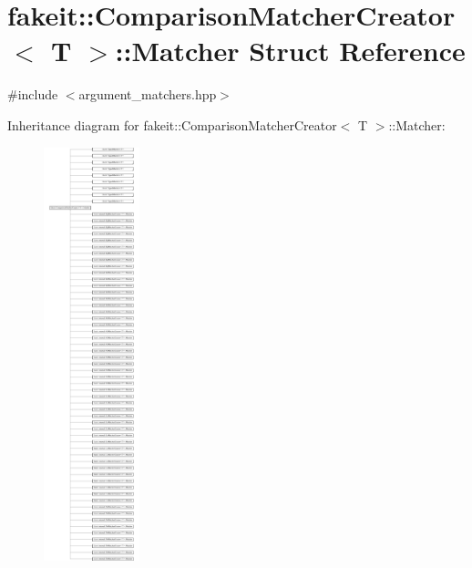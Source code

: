 \hypertarget{structfakeit_1_1ComparisonMatcherCreator_1_1Matcher}{}\section{fakeit\+::Comparison\+Matcher\+Creator$<$ T $>$\+::Matcher Struct Reference}
\label{structfakeit_1_1ComparisonMatcherCreator_1_1Matcher}


{\ttfamily \#include $<$argument\+\_\+matchers.\+hpp$>$}

Inheritance diagram for fakeit\+::Comparison\+Matcher\+Creator$<$ T $>$\+::Matcher\+:\begin{figure}[H]
\begin{center}
\leavevmode
\includegraphics[height=12.000000cm]{structfakeit_1_1ComparisonMatcherCreator_1_1Matcher}
\end{center}
\end{figure}
